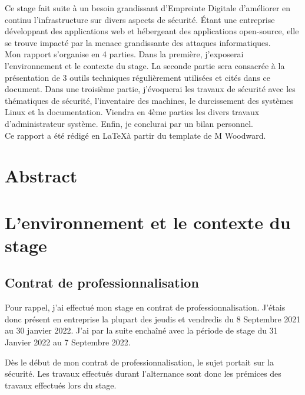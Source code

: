 \documentclass[12pt]{article}
\begin{document}
Ce stage fait suite à un besoin grandissant d'Empreinte Digitale d'améliorer en continu l'infrastructure sur divers aspects de sécurité. 
Étant une entreprise développant des applications web et hébergeant des applications open-source, elle se trouve impacté par la menace grandissante des attaques informatiques. \\

Mon rapport s'organise en 4 parties. 
Dans la première, j'exposerai l'environnement et le contexte du stage. 
La seconde partie sera consacrée à la présentation de 3 outils techniques régulièrement utilisées et cités dans ce document. 
Dans une troisième partie, j'évoquerai les travaux de sécurité avec les thématiques de sécurité, l'inventaire des machines, le durcissement des systèmes Linux et la documentation. 
Viendra en 4ème parties les divers travaux d'administrateur système. 
Enfin, je conclurai par un bilan personnel. \\

Ce rapport a été rédigé en \LaTeX à partir du template de M Woodward.

\newpage
\section{Abstract}

\newpage
\section{L'environnement et le contexte du stage}

\subsection{Contrat de professionnalisation}
Pour rappel, j'ai effectué mon stage en contrat de professionnalisation. 
J'étais donc présent en entreprise la plupart des jeudis et vendredis du 8 Septembre 2021 au 30 janvier 2022. 
J'ai par la suite enchaîné avec la période de stage du 31 Janvier 2022 au 7 Septembre 2022.

Dès le début de mon contrat de professionnalisation, le sujet portait sur la sécurité. 
Les travaux effectués durant l'alternance sont donc les prémices des travaux effectués lors du stage.
\end{document}
